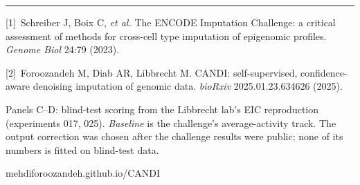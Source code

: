 \documentclass{article}
\newcommand{\smallsize}{\fontsize{25}{33}\selectfont}
\begin{document}
\vspace{1.3in}
{\color{rule}\rule{\linewidth}{3pt}}\par\vspace{0.5in}
\begin{minipage}[c]{34in}
{\smallsize\color{muted}
[1]~Schreiber J, Boix C, \textit{et al.} The ENCODE Imputation Challenge: a critical
assessment of methods for cross-cell type imputation of epigenomic profiles.
\textit{Genome Biol} 24:79 (2023).\par\vspace{0.12in}
[2]~Foroozandeh M, Diab AR, Libbrecht M. CANDI: self-supervised, confidence-aware
denoising imputation of genomic data. \textit{bioRxiv} 2025.01.23.634626 (2025).\par
\vspace{0.12in}
Panels C--D: blind-test scoring from the Libbrecht lab's EIC reproduction
(experiments 017, 025). \emph{Baseline} is the challenge's average-activity track.
The output correction was chosen after the challenge results were public; none of
its numbers is fitted on blind-test data.\par}
\end{minipage}\hfill
\begin{minipage}[c]{7in}
\raggedleft
{\smallsize\color{muted}mehdiforoozandeh.github.io/CANDI\par}\vspace{0.2in}
\end{minipage}\par
{}
\end{document}
